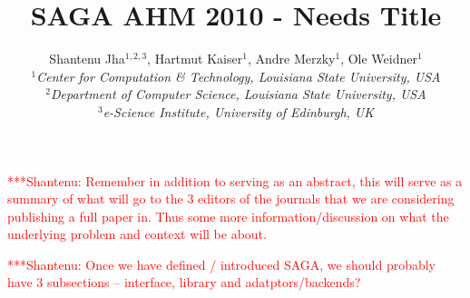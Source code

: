 \documentclass[a4paper,10pt]{article}
\newcommand{\jhanote}[1]{  {\textcolor{red}     { ***Shantenu: #1 }}}
\newcommand{\jhanote}[1]{}
\begin{document}
 \title{  \vspace{-3.5em}	SAGA AHM 2010 - Needs Title}
 
 \author{Shantenu Jha$^{1,2,3}$, Hartmut Kaiser$^{1}$, Andre Merzky$^{1}$, Ole Weidner$^{1}$ \\
   \small{\emph{$^{1}$Center for Computation \& Technology, Louisiana State University, USA}}\\
   \small{\emph{$^{2}$Department of Computer Science, Louisiana State University, USA}}\\
   \small{\emph{$^{3}$e-Science Institute, University of Edinburgh, UK}}
 }
 \date{}
 \maketitle
 

 \jhanote{Remember in addition to serving as an abstract, this will
   serve as a summary of what will go to the 3 editors of the journals
   that we are considering publishing a full paper in. Thus some more
   information/discussion on what the underlying problem and context
   will be about.}


 \jhanote{Once we have defined / introduced SAGA, we should probably
   have 3 subsections -- interface, library and adatptors/backends?}
\end{document}
